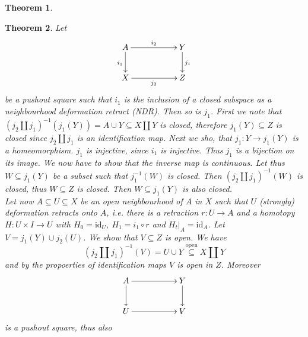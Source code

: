 \documentclass[11pt]{book}
\numberwithin{dummy}{section}
\newtheorem{theorem}{Theorem}[section]
\theoremstyle{nonumberbreak}
\newenvironment{pr}[1][]{\ifthenelse{\equal{#1}{}}{\proof}{\proof[#1]}\rm}{\endproof}
\newcommand{\la}{\longrightarrow}
\newcommand{\id}{\mathrm{id}}
\begin{document}
\begin{spacing}{1.4}
\begin{theorem}
\end{theorem}

\begin{theorem}   %
Let 
$$
\begin{xy}
\xymatrix{
A \ar[rr]^{i_2} \ar[d]_{i_1} && Y \ar[d]^{j_1} \\ X \ar[rr]_{j_2} && Z
}
\end{xy}
$$
be a pushout square such that $i_1$ is the inclusion of a closed subspace as a neighbourhood deformation retract (NDR). Then so is $j_1$. 
\begin{pr}
First we note that $(j_2 \amalg j_1)^{-1} (j_1(Y)) = A \cup Y \subseteq X \amalg Y$ is closed, therefore $j_1(Y) \subseteq Z$ is closed since $j_2 \amalg j_1$ is an identification map. Next we sho, that $j_1: Y \la j_1(Y)$ is a homeomorphism. $j_1$ is injective, since $i_1$ is injective. Thus $j_1$ is a bijection on its image. We now have to show that the inverse map is continuous. Let thus $W \subseteq j_1(Y)$ be a subset such that $j_1^{-1}(W)$ is closed. Then $(j_2 \amalg j_1)^{-1}(W)$ is closed, thus $ W\subseteq Z$ is closed. Then $W \subseteq j_1(Y)$ is also closed.\\
Let now $A \subseteq U \subseteq X$ be an open neighbourhood of $A$ in $X$ such that $U$ (strongly) deformation retracts onto $A$, i.e. there is a retraction $r:U \la A$ and a homotopy $H: U \times I \la U$ with $H_0 = \id_U$, $H_1 = i_1 \circ r$ and $H_t \vert_A = \id_A$. Let $V= j_1(Y) \cup j_2(U)$. We show that $V\subseteq Z$ is open. We have
$$(j_2 \amalg j_1)^{-1}(V) = U \cup Y \overset{\mathrm{open}}{\subseteq} X \amalg Y$$
and by the propoerties of identification maps $V$ is open in $Z$. Moreover
$$
\begin{xy}
\xymatrix{
A \ar[rr]\ar[d]&& Y \ar[d] \\ U \ar[rr] && V } 
\end{xy}
$$
is a pushout square, thus also 


\end{pr}
\end{theorem}
\end{spacing}
\end{document}

